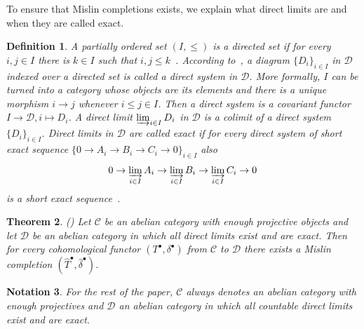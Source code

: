 \documentclass[12pt, a4paper]{article}
\numberwithin{equation}{section}
\newtheorem{thm}{Theorem}[section]
\newtheorem{defn}[thm]{Definition}
\newtheorem{notn}[thm]{Notation}
\theoremstyle{empty}
\theoremstyle{nonumberplain}
\begin{document}
To ensure that Mislin completions exists, we explain what direct limits are and when they are called exact.

\begin{defn}\label{defn:directlimit}
A partially ordered set $(I, \leq)$ is a directed set if for every $i, j \in I$ there is $k \in I$ such that $i,j \leq k$~\cite[p.~1]{rib10}. According to~\cite[p.~14]{rib10}, a diagram $\lbrace D_i \rbrace_{i \in I}$ in $\mathcal{D}$ indexed over a directed set is called a direct system in $\mathcal{D}$. More formally, $I$ can be turned into a category whose objects are its elements and there is a unique morphism $i \rightarrow j$ whenever $i \leq j \in I$. Then a direct system is a covariant functor $I \rightarrow \mathcal{D}, i \mapsto D_i$. A direct limit $\varinjlim_{i \in I} D_i$ in $\mathcal{D}$ is a colimit of a direct system $\lbrace D_i \rbrace_{i \in I}$. Direct limits in $\mathcal{D}$ are called exact if for every direct system of short exact sequence $\lbrace 0 \rightarrow A_i \rightarrow B_i \rightarrow C_i \rightarrow 0 \rbrace_{i \in I}$ also
\[ 0 \rightarrow \varinjlim_{i \in I} A_i \rightarrow \varinjlim_{i \in I} B_i \rightarrow \varinjlim_{i \in I} C_i \rightarrow 0 \]
is a short exact sequence~\cite[\href{https://stacks.math.columbia.edu/tag/079A}{Tag 079A}]{stacks-project}.
\end{defn}

\begin{thm}
(\cite[Theorem~3.2]{ghe24}) Let $\mathcal{C}$ be an abelian category with enough projective objects and let $\mathcal{D}$ be an abelian category in which all direct limits exist and are exact. Then for every cohomological functor $(T^{\bullet}, \delta^{\bullet})$ from $\mathcal{C}$ to $\mathcal{D}$ there exists a Mislin completion $(\widehat{T}^{\bullet}, \widehat{\delta}^{\bullet})$.
\end{thm}

\begin{notn}
For the rest of the paper, $\mathcal{C}$ always denotes an abelian category with enough projectives and $\mathcal{D}$ an abelian category in which all countable direct limits exist and are exact.
\end{notn}
\end{document}
